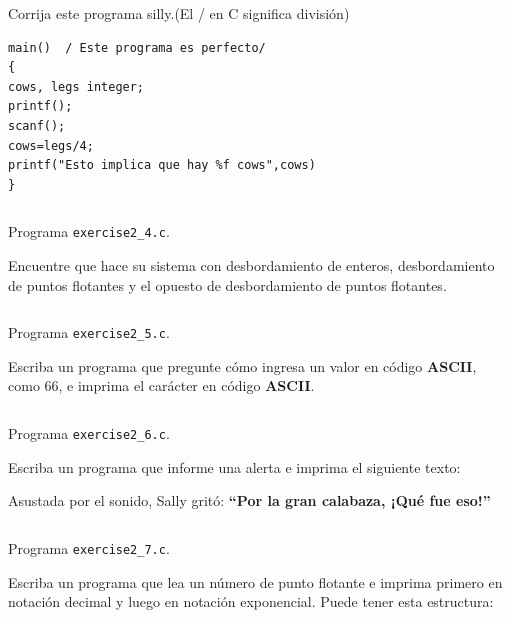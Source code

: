 \documentclass[spanish,addpoints,answers,a4paper]{exam}
\begin{document}
\begin{questions}
\question Corrija este programa silly.\qquad(El / en C significa división)

\begin{verbatim}
main()	/ Este programa es perfecto/
{
cows, legs integer;
printf();
scanf();
cows=legs/4;
printf("Esto implica que hay %f cows",cows)
}
\end{verbatim}

\begin{solution}
\begin{listing}[H]
	\footnotesize
	\inputminted{c}{exercise2_4.c}
	\caption{Programa \texttt{exercise2\_4.c}.}
	\label{lst:2.4}
\end{listing}
\end{solution}

\question Encuentre que hace su sistema con desbordamiento de enteros, desbordamiento de puntos flotantes y el opuesto de desbordamiento de puntos flotantes.

\begin{solution}
\begin{listing}[H]
\footnotesize
\inputminted{c}{exercise2_5.c}
\caption{Programa \texttt{exercise2\_5.c}.}
\label{lst:2.5}
\end{listing}
\end{solution}

\question Escriba un programa que pregunte cómo ingresa un valor en código \textbf{ASCII}, como $66$, e imprima el carácter en código \textbf{ASCII}.

\begin{solution}
\begin{listing}[H]
\footnotesize
\inputminted{c}{exercise2_6.c}
\caption{Programa \texttt{exercise2\_6.c}.}
\label{lst:2.6}
\end{listing}
\end{solution}

\question Escriba un programa que informe una alerta e imprima el siguiente texto:

Asustada por el sonido, Sally gritó: \textbf{``Por la gran calabaza, ¡Qué fue eso!''}

\begin{solution}
\begin{listing}[H]
\footnotesize
\inputminted{c}{exercise2_7.c}
\caption{Programa \texttt{exercise2\_7.c}.}
\label{lst:2.7}
\end{listing}	
\end{solution}

\question Escriba un programa que lea un número de punto flotante e imprima primero en notación decimal y luego en notación exponencial. Puede tener esta estructura:


\end{questions}
\end{document}
